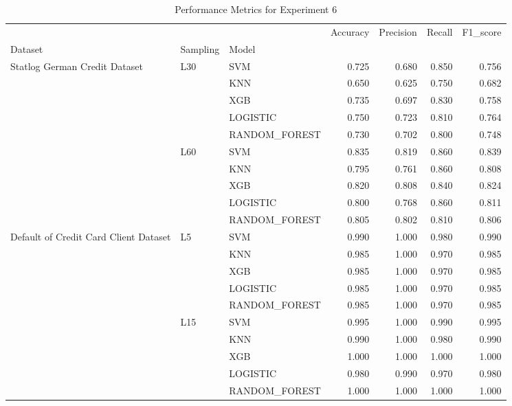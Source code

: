 \begin{table}
\caption{Performance Metrics for Experiment 6}
\label{tab:experiment_6_results}
\begin{tabular}{lllrrrr}
\toprule
 &  &  & Accuracy & Precision & Recall & F1\_score \\
Dataset & Sampling & Model &  &  &  &  \\
\midrule
\multirow[t]{10}{*}{Statlog German Credit Dataset} & \multirow[t]{5}{*}{L30} & SVM & 0.725 & 0.680 & 0.850 & 0.756 \\
 &  & KNN & 0.650 & 0.625 & 0.750 & 0.682 \\
 &  & XGB & 0.735 & 0.697 & 0.830 & 0.758 \\
 &  & LOGISTIC & 0.750 & 0.723 & 0.810 & 0.764 \\
 &  & RANDOM\_FOREST & 0.730 & 0.702 & 0.800 & 0.748 \\
\cline{2-7}
 & \multirow[t]{5}{*}{L60} & SVM & 0.835 & 0.819 & 0.860 & 0.839 \\
 &  & KNN & 0.795 & 0.761 & 0.860 & 0.808 \\
 &  & XGB & 0.820 & 0.808 & 0.840 & 0.824 \\
 &  & LOGISTIC & 0.800 & 0.768 & 0.860 & 0.811 \\
 &  & RANDOM\_FOREST & 0.805 & 0.802 & 0.810 & 0.806 \\
\cline{1-7} \cline{2-7}
\multirow[t]{10}{*}{Default of Credit Card Client Dataset} & \multirow[t]{5}{*}{L5} & SVM & 0.990 & 1.000 & 0.980 & 0.990 \\
 &  & KNN & 0.985 & 1.000 & 0.970 & 0.985 \\
 &  & XGB & 0.985 & 1.000 & 0.970 & 0.985 \\
 &  & LOGISTIC & 0.985 & 1.000 & 0.970 & 0.985 \\
 &  & RANDOM\_FOREST & 0.985 & 1.000 & 0.970 & 0.985 \\
\cline{2-7}
 & \multirow[t]{5}{*}{L15} & SVM & 0.995 & 1.000 & 0.990 & 0.995 \\
 &  & KNN & 0.990 & 1.000 & 0.980 & 0.990 \\
 &  & XGB & 1.000 & 1.000 & 1.000 & 1.000 \\
 &  & LOGISTIC & 0.980 & 0.990 & 0.970 & 0.980 \\
 &  & RANDOM\_FOREST & 1.000 & 1.000 & 1.000 & 1.000 \\
\cline{1-7} \cline{2-7}
\bottomrule
\end{tabular}
\end{table}
